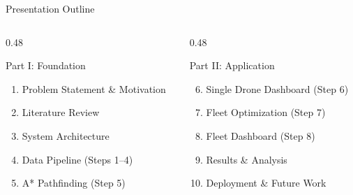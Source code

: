 \documentclass[aspectratio=169, 11pt]{beamer}
\begin{document}
\begin{frame}{Presentation Outline}
\begin{columns}[T]
\begin{column}{0.48\textwidth}
\begin{block}{Part I: Foundation}
\begin{enumerate}
    \item Problem Statement \& Motivation
    \item Literature Review
    \item System Architecture
    \item Data Pipeline (Steps 1--4)
    \item A* Pathfinding (Step 5)
\end{enumerate}
\end{block}
\end{column}
\begin{column}{0.48\textwidth}
\begin{block}{Part II: Application}
\begin{enumerate}\setcounter{enumi}{5}
    \item Single Drone Dashboard (Step 6)
    \item Fleet Optimization (Step 7)
    \item Fleet Dashboard (Step 8)
    \item Results \& Analysis
    \item Deployment \& Future Work
\end{enumerate}
\end{block}
\end{column}
\end{columns}
\end{frame}
\end{document}
